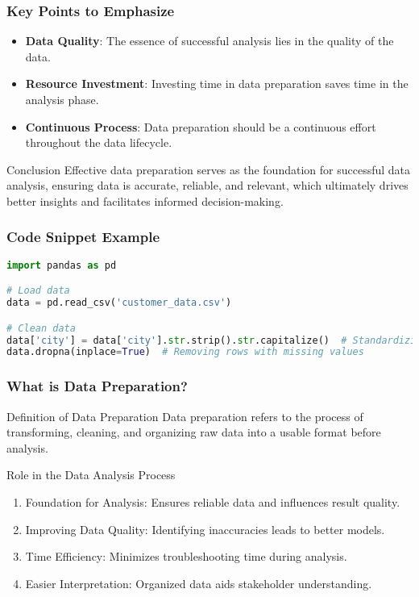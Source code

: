 \documentclass{beamer}
\begin{document}
\begin{frame}[fragile]
    \frametitle{Key Points to Emphasize}
    \begin{itemize}
        \item \textbf{Data Quality}: The essence of successful analysis lies in the quality of the data.
        \item \textbf{Resource Investment}: Investing time in data preparation saves time in the analysis phase.
        \item \textbf{Continuous Process}: Data preparation should be a continuous effort throughout the data lifecycle.
    \end{itemize}

    \begin{block}{Conclusion}
        Effective data preparation serves as the foundation for successful data analysis, ensuring data is accurate, reliable, and relevant, which ultimately drives better insights and facilitates informed decision-making.
    \end{block}
\end{frame}

\begin{frame}[fragile]
    \frametitle{Code Snippet Example}
    \begin{lstlisting}[language=Python]
import pandas as pd

# Load data
data = pd.read_csv('customer_data.csv')

# Clean data
data['city'] = data['city'].str.strip().str.capitalize()  # Standardizing city names
data.dropna(inplace=True)  # Removing rows with missing values
    \end{lstlisting}
\end{frame}

\begin{frame}[fragile]
    \frametitle{What is Data Preparation?}
    \begin{block}{Definition of Data Preparation}
        Data preparation refers to the process of transforming, cleaning, and organizing raw data into a usable format before analysis.
    \end{block}
    \begin{block}{Role in the Data Analysis Process}
        \begin{enumerate}
            \item Foundation for Analysis: Ensures reliable data and influences result quality.
            \item Improving Data Quality: Identifying inaccuracies leads to better models.
            \item Time Efficiency: Minimizes troubleshooting time during analysis.
            \item Easier Interpretation: Organized data aids stakeholder understanding.
        \end{enumerate}
    \end{block}
\end{frame}
\end{document}
